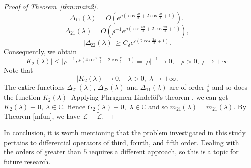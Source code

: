 \documentclass[reqno,12pt,centertags]{amsart}
\numberwithin{equation}{section}
\theoremstyle{definition}
\begin{document}
\begin{proof}[Proof of Theorem~\ref{thm:main2}]
	\begin{equation*}
		{\Delta}_{11}(\lambda)=O(e^{\rho(\cos\frac{6\pi}{5}+2\cos\frac{2\pi}{5}+1)}),
	\end{equation*}
	\begin{equation*}
		{\Delta}_{21}(\lambda)=O(\rho^{-1}e^{\rho(\cos\frac{6\pi}{5}+2\cos\frac{2\pi}{5}+1)}),
	\end{equation*}
	\begin{equation*}
		|{\Delta}_{22}(\lambda)|\geq C_{\delta}e^{\rho(2\cos\frac{2\pi}{5}+1)}.
	\end{equation*}
	Consequently, we obtain
	\begin{equation*}
		|K_{2}(\lambda)|\leq|\rho|^{-1}e^{\rho(4\cos^{2}\frac{\pi}{5}-2\cos\frac{\pi}{5}-1)}=|\rho|^{-1}\rightarrow 0,\;\;\;\rho > 0,\; \rho \to +\infty.
	\end{equation*}
	Note that
	\begin{equation*}
		|K_{2}(\lambda)|\rightarrow0,\;\;\;\lambda > 0,\;\lambda\rightarrow+\infty.
	\end{equation*}
	The entire functions ${\Delta}_{21}(\lambda)$, ${\Delta}_{22}(\lambda)$ and ${\Delta}_{11}(\lambda)$ are of order $\frac{1}{5}$ and so does the function $K_{2}(\lambda)$. Applying Phragmen-Lindel\"of's theorem \cite{BFY},  we can get $K_{2}(\lambda) \equiv 0,\;\lambda\in \mathbb{C}$. Hence $G_{2}(\lambda) \equiv 0,\;\lambda\in \mathbb{C}$ and so $m_{21}(\lambda)=\tilde{m}_{21}(\lambda)$.
	By Theorem \ref{mfun}, we have $\mathcal{L}=\tilde{\mathcal{L}}.$
	
\end{proof}

In conclusion, it is worth mentioning that the problem investigated in this study pertains to differential operators of third, fourth, and fifth order. Dealing with the orders of greater than $5$ requires a different approach, so this is a topic for future research.
	
\end{document}
